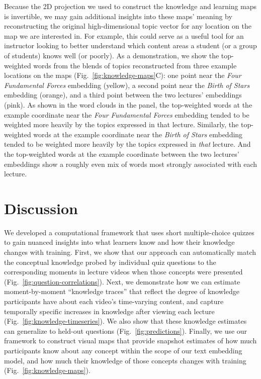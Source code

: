 \documentclass[10pt]{article}
\begin{document}
Because the 2D projection we used to construct the knowledge and learning maps
is invertible, we may gain additional insights into these maps' meaning by
reconstructing the original high-dimensional topic vector for any location on
the map we are interested in. For example, this could serve as a useful tool
for an instructor looking to better understand which content areas a student
(or a group of students) knows well (or poorly). As a demonstration, we show
the top-weighted words from the blends of topics reconstructed from three
example locations on the maps (Fig.~\ref{fig:knowledge-maps}C): one point near
the \textit{Four Fundamental Forces} embedding (yellow), a second point near
the \textit{Birth of Stars} embedding (orange), and a third point between the
two lectures' embeddings (pink). As shown in the word clouds in the panel, the
top-weighted words at the example coordinate near the \textit{Four Fundamental
Forces} embedding tended to be weighted more heavily by the topics expressed in
that lecture. Similarly, the top-weighted words at the example coordinate near
the \textit{Birth of Stars} embedding tended to be weighted more heavily by the
topics expressed in \textit{that} lecture. And the top-weighted words at the
example coordinate between the two lectures' embeddings show a roughly even mix
of words most strongly associated with each lecture.

\section*{Discussion}

We developed a computational framework that uses short multiple-choice quizzes
to gain nuanced insights into what learners know and how their knowledge
changes with training. First, we show that our approach can automatically match
the conceptual knowledge probed by individual quiz questions to the
corresponding moments in lecture videos when those concepts were presented
(Fig.~\ref{fig:question-correlations}). Next, we demonstrate how we can
estimate moment-by-moment ``knowledge traces'' that reflect the degree of
knowledge participants have about each video's time-varying content, and
capture temporally specific increases in knowledge after viewing each lecture
(Fig.~\ref{fig:knowledge-timeseries}). We also show that these knowledge
estimates can generalize to held-out questions (Fig.~\ref{fig:predictions}).
Finally, we use our framework to construct visual maps that provide snapshot
estimates of how much participants know about any concept within the scope of
our text embedding model, and how much their knowledge of those concepts
changes with training (Fig.~\ref{fig:knowledge-maps}).
\end{document}
